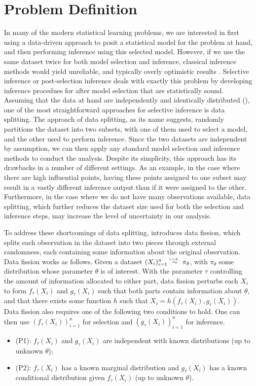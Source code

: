 \section{Problem Definition}\label{sec:problem_def}
In many of the modern statistical learning problems, we are interested in first using a data-driven approach to posit a statistical model for the problem at hand, and then performing inference using this selected model. However, if we use the same dataset twice for both model selection and inference, classical inference methods would yield unreliable, and typically overly optimistic results \citep{hong2018overfitting}. Selective inference or post-selection inference deals with exactly this problem by developing inference procedues for after model selection that are statistically sound. Assuming that the data at hand are independently and identically distributed (\iid), one of the most straightforward approaches for selective inference is data splitting. The approach of data splitting, as its name suggests, randomly partitions the dataset into two subsets, with one of them used to select a model, and the other used to perform inference. Since the two datasets are independent by assumption, we can then apply any standard model selection and inference methods to conduct the analysis. Despite its simplicity, this approach has its drawbacks in a number of different settings. As an example, in the case where there are high influential points, having these points assigned to one subset may result in a vastly different inference output than if it were assigned to the other. Furthermore, in the case where we do not have many observations available, data splitting, which further reduces the dataset size used for both the selection and inference steps, may increase the level of uncertainty in our analysis.

To address these shortcomings of data splitting, \cite{leiner2022data} introduces data fission, which splits each observation in the dataset into two pieces through external randomness, each containing some information about the original observation. Data fission works as follows. Given a dataset $(X_i)_{i=1}^n \overset{\textrm{\tiny i.i.d.\ }}{\sim} \pi_\theta$, with $\pi_\theta$ some distribution whose parameter $\theta$ is of interest. With the parameter $\tau$ controlling the amount of information allocated to either part, data fission perturbs each $X_i$ to form $f_\tau(X_i)$ and $g_\tau(X_i)$ such that both parts contain information about $\theta$, and that there exists some function $h$ such that $X_i = h(f_\tau(X_i), g_\tau(X_i))$. Data fission also requires one of the following two conditions to hold. One can then use $\left(f_\tau(X_i)\right)_{i=1}^n$ for selection and $\left(g_\tau(X_i)\right)_{i=1}^n$ for inference.
\begin{itemize}
\item (P1): $f_\tau(X_i)$ and $g_\tau(X_i)$ are independent with known distributions (up to unknown $\theta$);
\item (P2): $f_\tau(X_i)$ has a known marginal distribution and $g_\tau(X_i)$ has a known conditional distribution given $f_\tau(X_i)$ (up to unknown $\theta$).
\end{itemize}

